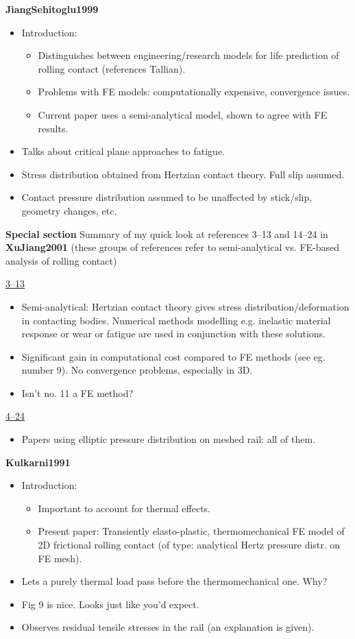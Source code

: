 \documentclass{article}
\begin{document}
\textbf{JiangSehitoglu1999}
\begin{itemize}
\item Introduction:
\begin{itemize}
\item Distinguishes between engineering/research models for life prediction of rolling contact (references Tallian).
\item Problems with FE models: computationally expensive, convergence issues.
\item Current paper uses a semi-analytical model, shown to agree with FE results.
\end{itemize}
\item Talks about critical plane approaches to fatigue.
\item Stress distribution obtained from Hertzian contact theory. Full slip assumed.
\item Contact pressure distribution assumed to be unaffected by stick/slip, geometry changes, etc.
\end{itemize}

\textbf{Special section}
Summary of my quick look at references 3--13 and 14--24 in \textbf{XuJiang2001} (these groups of references refer to semi-analytical vs. FE-based analysis of rolling contact)

\noindent
\underline{3--13}
\begin{itemize}
\item Semi-analytical: Hertzian contact theory gives stress distribution/deformation in contacting bodies. Numerical methods modelling e.g. inelastic material response or wear or fatigue are used in conjunction with these solutions.
\item Significant gain in computational cost compared to FE methods (see eg. number 9). No convergence problems, especially in 3D.
\item Isn't no. 11 a FE method?
\end{itemize}
\underline{4--24}
\begin{itemize}
\item Papers using elliptic pressure distribution on meshed rail: all of them.
\end{itemize}


\textbf{Kulkarni1991}
\begin{itemize}
\item Introduction:
\begin{itemize}
\item Important to account for thermal effects.
\item Present paper: Transiently elasto-plastic, thermomechanical FE model of 2D frictional rolling contact (of type: analytical Hertz pressure distr. on FE mesh).
\end{itemize}
\item Lets a purely thermal load pass before the thermomechanical one. Why?
\item Fig 9 is nice. Looks just like you'd expect.
\item Observes residual tensile stresses in the rail (an explanation is given).
\end{itemize}
\end{document}
